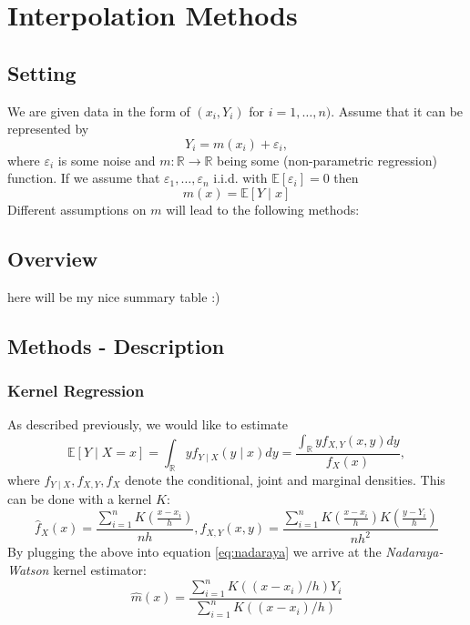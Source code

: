 \chapter{Interpolation Methods}


\footnotesize

\normalsize

\section{Setting}

We are given data in the form of $\left(x_{i}, Y_{i}\right)$ for $i=1, \ldots, n)$. Assume that it can be represented by
$$
  Y_{i}=m\left(x_{i}\right)+\varepsilon_{i},
$$
where $\varepsilon_i$ is some noise and $m: \mathbb{R} \rightarrow \mathbb{R}$ being some (non-parametric regression) function. If we assume that $\varepsilon_{1}, \ldots, \varepsilon_{n}$ i.i.d. with $\mathbb{E}\left[\varepsilon_{i}\right]=0$ then $$m(x)=\mathbb{E}[Y \mid x]$$
Different assumptions on $m$ will lead to the following methods:

\section{Overview}
here will be my nice summary table :)


\section{Methods - Description}

\subsection{Kernel Regression}
\label{sec:Kernel}
As described previously, we would like to estimate
\begin{equation}
  \label{eq:nadaraya}
  \mathbb{E}[Y \mid X=x]
  = \int_{\mathbb{R}} y f_{Y \mid X}(y \mid x) d y
  =\frac{\int_{\mathbb{R}} y f_{X, Y}(x, y) d y}{f_{X}(x)},
\end{equation}
where $f_{Y \mid X}, f_{X, Y}, f_{X}$ denote the conditional, joint and marginal densities.
This can be done with a kernel $K$:
$$
  \hat{f}_{X}(x)=\frac{\sum_{i=1}^{n} K\left(\frac{x-x_{i}}{h}\right)}{n h}, \hat{f}_{X, Y}(x, y)=\frac{\sum_{i=1}^{n} K\left(\frac{x-x_{i}}{h}\right) K\left(\frac{y-Y_{i}}{h}\right)}{n h^{2}}
$$
By plugging the above into equation \ref{eq:nadaraya} we arrive at the \textit{Nadaraya-Watson} kernel estimator:
$$\hat{m}(x)=\frac{\sum_{i=1}^{n} K\left(\left(x-x_{i}\right) / h\right) Y_{i}}{\sum_{i=1}^{n} K\left(\left(x-x_{i}\right) / h\right)}$$


